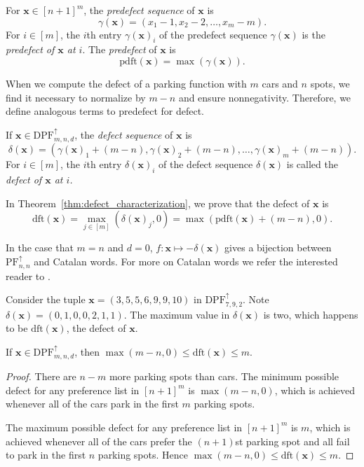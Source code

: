 \documentclass[11pt,reqno]{BICA}
\theoremstyle{definition}
\newcommand{\NDPF}{\mathrm{PF}^{\uparrow}}
\newcommand{\NDDPF}{\mathrm{DPF}^\uparrow}
\newcommand{\x}{\mathbf{x}}
\newcommand{\de}{\mathrm{dft}}
\newcommand{\pde}{\mathrm{pdft}}
\begin{document}
\begin{definition}\label{def:predefect}
    For $\x\in[n+1]^m$, the \emph{predefect sequence} of $\x$ is 
    \[\gamma(\x) = (x_1 - 1, x_2 - 2, \ldots, x_m - m).\]
    For $i \in [m]$, the $i$th entry $\gamma(\x)_i$ of the predefect sequence $\gamma(\x)$ is the \emph{predefect of $\x$ at $i$}. The \emph{predefect} of $\x$ is 
    \[\pde(\x)=\max(\gamma(\x)).\]
\end{definition}

When we compute the defect of a parking function with $m$ cars and $n$ spots, we find it necessary to normalize by $m-n$ and ensure nonnegativity. Therefore, we define analogous terms to predefect for defect.

\begin{definition} 
If $\x \in \NDDPF_{m,n,d}$, the \emph{defect sequence} of $\x$ is \[\delta(\x)=(\gamma(\x)_1 + (m-n), \gamma(\x)_2 + (m-n), \ldots, \gamma(\x)_m + (m-n)).\]
For $i\in [m]$, the  $i$th entry $\delta(\x)_i$ of the defect sequence $\delta(\x)$ is called the \textit{defect of $\x$ at $i$.} 
\end{definition}
In Theorem~\ref{thm:defect_characterization}, we prove that the defect of $\x$ is
\[\de(\x) = \max_{j \in [m]}(\delta(\x)_j, 0) = \max(\pde(\x) + (m-n), 0).\]

\begin{remark}In the case that $m=n$ and $d=0$, $f: \x \mapsto -\delta(\x)$ gives a bijection between $\NDPF_{n,n}$ and Catalan words. For more on Catalan words we refer the interested reader to \cite[Exercise 6.19.\ u, p.\ 222]{StanleyECVol2}.\end{remark}

\begin{example}\label{ex:nonneg defect}
Consider the tuple $\x=(3,5,5,6,9,9,10)$ in $\NDDPF_{7,9,2}$. Note 
$\delta(\x)=
(0,1,0,0,2,1,1)$.
The maximum value in $\delta(\x)$ is two, which happens to be $\de(\x)$, the defect of $\x$. 
\end{example}


\begin{lemma}
If $\x\in\NDDPF_{m,n,d}$, then $\max(m-n, 0)\leq \de(\x)\leq m$. 
\end{lemma}

\begin{proof}
    There are $n-m$ more parking spots than cars. The minimum possible defect for any preference list in $[n+1]^m$ is $\max(m-n,0)$, which is achieved whenever all of the cars park in the first $m$ parking spots. 
    
The maximum possible defect for any preference list in $[n+1]^m$ is $m$, which is achieved whenever all of the cars prefer the $(n+1)$st parking spot and all fail to park in the first $n$ parking spots.
Hence $\max(m-n,0)\leq \de(\x)\leq m$.
\end{proof}
\end{document}
